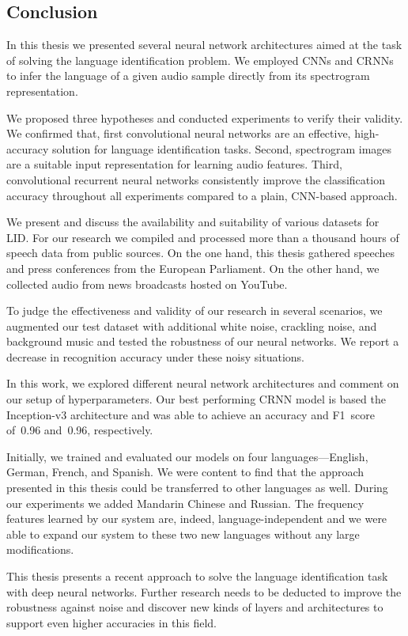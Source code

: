 \subsection{Conclusion}
In this thesis we presented several neural network architectures aimed at the task of solving the language identification problem. We employed CNNs and CRNNs to infer the language of a given audio sample directly from its spectrogram representation. 

We proposed three hypotheses and conducted experiments to verify their validity. We confirmed that, first convolutional neural networks are an effective, high-accuracy solution for language identification tasks. Second, spectrogram images are a suitable input representation for learning audio features. Third, convolutional recurrent neural networks consistently improve the classification accuracy throughout all experiments compared to a plain, CNN-based approach.

We present and discuss the availability and suitability of various datasets for LID. For our research we compiled and processed more than a thousand hours of speech data from public sources. On the one hand, this thesis gathered speeches and press conferences from the European Parliament. On the other hand, we collected audio from news broadcasts hosted on YouTube.

To judge the effectiveness and validity of our research in several scenarios, we augmented our test dataset with additional white noise, crackling noise, and background music and tested the robustness of our neural networks. We report a decrease in recognition accuracy under these noisy situations.

In this work, we explored different neural network architectures and comment on our setup of hyperparameters. Our best performing CRNN model is based the Inception-v3 architecture and was able to achieve an accuracy and F1~score of~\num{0.96} and~\num{0.96}, respectively.

Initially, we trained and evaluated our models on four languages---English, German, French, and Spanish. We were content to find that the approach presented in this thesis could be transferred to other languages as well. During our experiments we added Mandarin Chinese and Russian. The frequency features learned by our system are, indeed, language-independent and we were able to expand our system to these two new languages without any large modifications.

This thesis presents a recent approach to solve the language identification task with deep neural networks. Further research needs to be deducted to improve the robustness against noise and discover new kinds of layers and architectures to support even higher accuracies in this field. 
